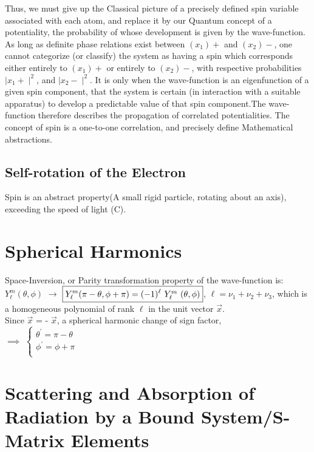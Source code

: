 \documentclass[a4paper, 10pt, onepage]{elegantbook}
\begin{document}
{Thus, we must give up the Classical picture of a precisely defined spin variable associated with each atom, and replace it by our Quantum concept of a potentiality, the probability of whose development is given by the wave-function.
As long as definite phase relations exist between $(x_1)+$ and $(x_2)-$, one cannot categorize (or classify) the system as having a spin which corresponds either entirely to $(x_1)+$ or entirely to $(x_2)-$, with respective probabilities $\mid {x_1+} \mid^2$, and $\mid {x_2-} \mid^2$.
It is only when the wave-function is an eigenfunction of a given spin component, that the system is certain (in interaction with a suitable apparatus) to develop a predictable value of that spin component.The wave-function therefore describes the propagation of correlated potentialities.
The concept of spin is a one-to-one correlation, and precisely define Mathematical abstractions.

\section{Self-rotation of the Electron}

Spin is an abstract property(A small rigid particle, rotating about an axis), exceeding the speed of light (C).

\chapter{Spherical Harmonics}

Space-Inversion, or Parity transformation property of the wave-function is:  \\
$Y^m_\ell (\theta, \phi)$ $\rightarrow$ $\boxed{Y^m_\ell(\pi - \theta, \phi + \pi) = (-1)^{\ell}$ $Y^m_\ell$ $(\theta, \phi)}$, $\boxed{\ell = \nu_1 + \nu_2 + \nu_3}$, which is a homogeneous polynomial of rank $\ell$ in the unit vector $\vec{x}$.  \\
Since $\vec{x}$ = - $\vec{x}$, a spherical harmonic change of sign factor,  \\
$\implies$
$\left\{
\begin{array}{ll}
   \theta^{'} = \pi - \theta  \\
   \phi^{'}   = \phi + \pi  \\
\end{array}
\right.$


\chapter{Scattering and Absorption of Radiation by a Bound System/S-Matrix Elements}



}
\end{document}
